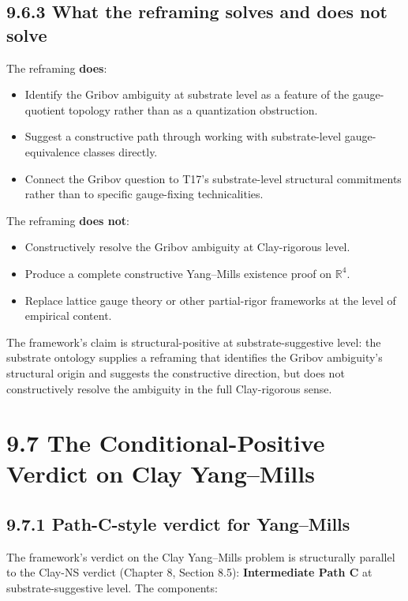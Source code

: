 \documentclass[11pt]{book}
\begin{document}
\subsection{9.6.3 What the reframing solves and does not solve}

The reframing \textbf{does}:
\begin{itemize}
\item Identify the Gribov ambiguity at substrate level as a feature of the gauge-quotient topology rather than as a quantization obstruction.
\item Suggest a constructive path through working with substrate-level gauge-equivalence classes directly.
\item Connect the Gribov question to T17's substrate-level structural commitments rather than to specific gauge-fixing technicalities.
\end{itemize}

The reframing \textbf{does not}:
\begin{itemize}
\item Constructively resolve the Gribov ambiguity at Clay-rigorous level.
\item Produce a complete constructive Yang–Mills existence proof on $\mathbb{R}^4$.
\item Replace lattice gauge theory or other partial-rigor frameworks at the level of empirical content.
\end{itemize}

The framework's claim is structural-positive at substrate-suggestive level: the substrate ontology supplies a reframing that identifies the Gribov ambiguity's structural origin and suggests the constructive direction, but does not constructively resolve the ambiguity in the full Clay-rigorous sense.

\section{9.7 The Conditional-Positive Verdict on Clay Yang–Mills}

\subsection{9.7.1 Path-C-style verdict for Yang–Mills}

The framework's verdict on the Clay Yang–Mills problem is structurally parallel to the Clay-NS verdict (Chapter 8, Section 8.5): \textbf{Intermediate Path C} at substrate-suggestive level. The components:
\end{document}
